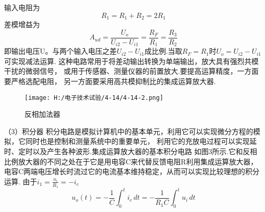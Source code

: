 \documentclass{article}
\begin{document}
     输入电阻为
   \begin{equation*}
    \  R_1=R_1+R_2=2R_1
  \end{equation*}
差模增益为
\begin{equation*}
    \  A_{ud}=\frac{U_o}{U_{i2}-U_{i1}}=\frac{R_F}{R_1}=\frac{R_3}{R_2}
  \end{equation*}
   即输出电压U。与两个输入电压之差$U_{i2}-U_{i1}$成比例.当取${R_F}={R_1}$时$U_o=U_{i2}-U_{i1}$可实现减法运算.
   这种电路常用于将差动输出转换为单端输出，放大具有强烈共模干扰的微弱信号，
            或用于传感器、测量仪器的前置放大.要提高运算精度，一方面要严格选配电阻，
            另一方面要采用高共模抑制比的集成运算放大器.
             \begin{figure}[h]
                \centering
                \texttt{[image: H:/电子技术试验/4-14/4-14-2.png]}
                \caption{反相加法器} \label{fig:aa}
            \end{figure}\par 

         
            （3）积分器
            积分电路是模拟计算机中的基本单元，利用它可以实现微分方程的模拟，它同时也是控制和测量系统中的重要单元，
            利用它的充放电过程可以实现延时、定时以及产生各种波形.集成运算放大器的基本积分电路
            如图3所示.它和反相比例放大器的不同之处在于它是用电容C来代替反馈电阻R利用集成运算放大器，
            电容C两端电压增长时流过它的电流基本维持稳定，从而可以实现比较理想的积分运算.   
            由于$i_1=\frac{u_i}{R_1}=-i_c$    
            \begin{equation*}
                \  u_o(t)=-\frac{1}{C}\int_{0}^{t}i_c  \, dt=-\frac{1}{R_1C}\int_{0}^{t} u_i\, dt 
              \end{equation*}
\end{document}
